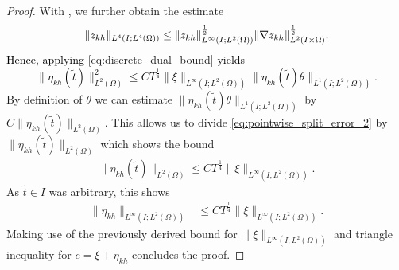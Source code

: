 \documentclass{m2an}
\newcommand\blue[1]{\textcolor{black}{#1}}
\newcommand{\uukh}{\overline{uu_{kh}}}
\newcommand{\zkh}{z_{kh}}
\newcommand{\LtwoLtwo}{L^2(I \times \Omega)}
\newcommand{\OseenConstant}{K\left(\|\uukh\|_{L^2(I;H^1(\Omega))\cap L^\infty(I;L^2(\Omega))}\right)}
\newcommand{\lnh}{|\!\ln h|}
\begin{document}
\begin{proof}
  With , we further obtain the estimate
  \begin{equation*}
    \|\zkh\|_{L^4(I;L^4(\Omega))} 
    \le \|\zkh\|_{L^\infty(I;L^2(\Omega))}^{\frac{1}{2}}\blue{\|\nabla\zkh\|_{\LtwoLtwo}^{\frac{1}{2}}}.
  \end{equation*}
  \blue{Hence, applying \eqref{eq:discrete_dual_bound} yields
    \begin{equation}\label{eq:pointwise_split_error_2}
    \|\eta_{kh}(\tilde t)\|_{L^2(\Omega)}^2
    \le C T^{\frac{1}{4}} \|\xi\|_{L^\infty(I;L^2(\Omega))}
    \|\eta_{kh}(\tilde t) \theta \|_{L^1(I;L^2(\Omega))}.
    \end{equation}
  }
  By definition of $\theta$ we can estimate $\|\eta_{kh}(\tilde t) \theta \|_{L^1(I;L^2(\Omega))}$
  by $C \|\eta_{kh}(\tilde t)\|_{L^2(\Omega)}$.
  This allows us to divide \eqref{eq:pointwise_split_error_2}
  by $\|\eta_{kh}(\tilde t)\|_{L^2(\Omega)}$ which shows the bound
  \begin{align*}
    \|\eta_{kh}(\tilde t)\|_{L^2(\Omega)} 
    \le C T^{\frac{1}{4}}\|\xi\|_{L^\infty(I;L^2(\Omega))}.
  \end{align*}
  As $\tilde t \in I$ was arbitrary,  this shows
  \begin{align*}
    \|\eta_{kh}\|_{L^\infty(I;L^2(\Omega))} 
    & \le C T^{\frac{1}{4}} \|\xi\|_{L^\infty(I;L^2(\Omega))}.
  \end{align*}
  Making use of the previously derived bound for $\|\xi\|_{L^\infty(I;L^2(\Omega))}$ and triangle
  inequality for $e = \xi + \eta_{kh}$ concludes the proof.
\end{proof}
\end{document}
